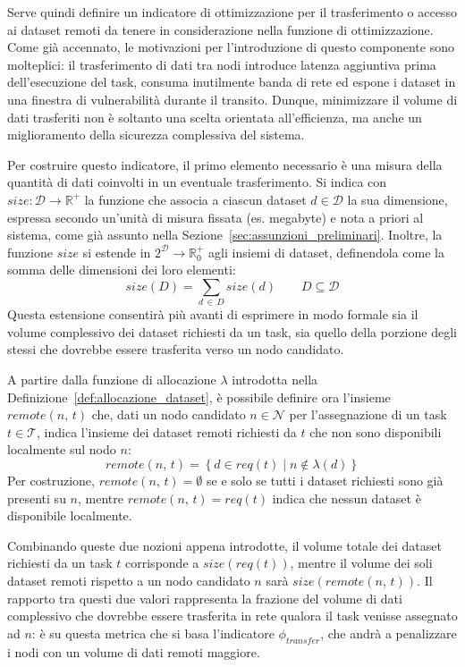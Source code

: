 Serve quindi definire un indicatore di ottimizzazione per il trasferimento o accesso ai dataset remoti da tenere in considerazione nella funzione di ottimizzazione. Come già accennato, le motivazioni per l'introduzione di questo componente sono molteplici: il trasferimento di dati tra nodi introduce latenza aggiuntiva prima dell'esecuzione del task, consuma inutilmente banda di rete ed espone i dataset in una finestra di vulnerabilità durante il transito. Dunque, minimizzare il volume di dati trasferiti non è soltanto una scelta orientata all'efficienza, ma anche un miglioramento della sicurezza complessiva del sistema.

Per costruire questo indicatore, il primo elemento necessario è una misura della quantità di dati coinvolti in un eventuale trasferimento. Si indica con $size: \mathcal{D} \rightarrow \mathbb{R}^+$ la funzione che associa a ciascun dataset $d \in \mathcal{D}$ la sua dimensione, espressa secondo un'unità di misura fissata (es. megabyte) e nota a priori al sistema, come già assunto nella Sezione~\ref{sec:assunzioni_preliminari}. Inoltre, la funzione $size$ si estende in $2^\mathcal{D} \rightarrow \mathbb{R}_0^+$ agli insiemi di dataset, definendola come la somma delle dimensioni dei loro elementi:
\begin{equation}
    size(D) = \sum_{d \,\in\, D} size(d)
    \qquad
    D \subseteq \mathcal{D}
\end{equation}
Questa estensione consentirà più avanti di esprimere in modo formale sia il volume complessivo dei dataset richiesti da un task, sia quello della porzione degli stessi che dovrebbe essere trasferita verso un nodo candidato.

A partire dalla funzione di allocazione $\lambda$ introdotta nella Definizione~\ref{def:allocazione_dataset}, è possibile definire ora l'insieme $remote(n,\, t)$ che, dati un nodo candidato $n \in \mathcal{N}$ per l'assegnazione di un task $t \in \mathcal{T}$, indica l'insieme dei dataset remoti richiesti da $t$ che non sono disponibili localmente sul nodo $n$: 
\begin{equation}
    remote(n,\, t) = \left\{ d \in req(t) \mid n \notin \lambda(d) \right\}
\end{equation}
Per costruzione, $remote(n,\, t) = \emptyset$ se e solo se tutti i dataset richiesti sono già presenti su $n$, mentre $remote(n,\, t) = req(t)$ indica che nessun dataset è disponibile localmente.

Combinando queste due nozioni appena introdotte, il volume totale dei dataset richiesti da un task $t$ corrisponde a $size(req(t))$, mentre il volume dei soli dataset remoti rispetto a un nodo candidato $n$ sarà $size(remote(n,\, t))$. Il rapporto tra questi due valori rappresenta la frazione del volume di dati complessivo che dovrebbe essere trasferita in rete qualora il task venisse assegnato ad $n$: è su questa metrica che si basa l'indicatore $\phi_{transfer}$, che andrà a penalizzare i nodi con un volume di dati remoti maggiore.

